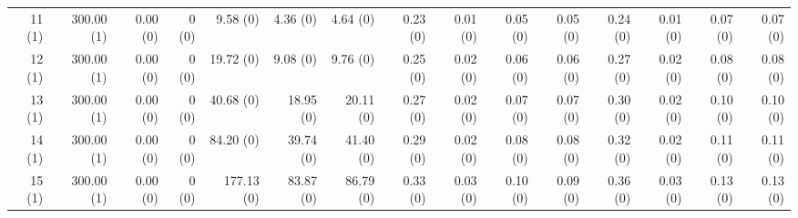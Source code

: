 \documentclass[11pt,fleqn,twoside]{article}
\begin{document}
{\begin{table}[t]
\begin{tabular}[t]{|r|r|r|r|r|r|r|r|r|r|r|r|r|r|r|}
11 (1) & 300.00 (1) & 0.00 (0) & 0 (0) & 9.58 (0) & 4.36 (0) & 4.64 (0) & 0.23 (0) & 0.01 (0) & 0.05 (0) & 0.05 (0) & 0.24 (0) & 0.01 (0) & 0.07 (0) & 0.07 (0) \\
12 (1) & 300.00 (1) & 0.00 (0) & 0 (0) & 19.72 (0) & 9.08 (0) & 9.76 (0) & 0.25 (0) & 0.02 (0) & 0.06 (0) & 0.06 (0) & 0.27 (0) & 0.02 (0) & 0.08 (0) & 0.08 (0) \\
13 (1) & 300.00 (1) & 0.00 (0) & 0 (0) & 40.68 (0) & 18.95 (0) & 20.11 (0) & 0.27 (0) & 0.02 (0) & 0.07 (0) & 0.07 (0) & 0.30 (0) & 0.02 (0) & 0.10 (0) & 0.10 (0) \\
14 (1) & 300.00 (1) & 0.00 (0) & 0 (0) & 84.20 (0) & 39.74 (0) & 41.40 (0) & 0.29 (0) & 0.02 (0) & 0.08 (0) & 0.08 (0) & 0.32 (0) & 0.02 (0) & 0.11 (0) & 0.11 (0) \\
15 (1) & 300.00 (1) & 0.00 (0) & 0 (0) & 177.13 (0) & 83.87 (0) & 86.79 (0) & 0.33 (0) & 0.03 (0) & 0.10 (0) & 0.09 (0) & 0.36 (0) & 0.03 (0) & 0.13 (0) & 0.13 (0) \\

\end{tabular}
\end{table}}
\end{document}
